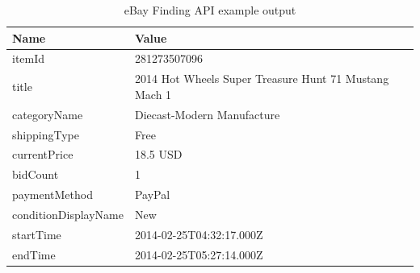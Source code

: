 \begin{table}[h!]
	\begin{center}
	\begin{tabular}{| p{6.5cm} | p{6.5cm} |}
		\hline
		\textbf{Name} & \textbf{Value} \\
		\hline
		itemId & 281273507096 \\
		\hline
		title & 2014 Hot Wheels Super Treasure Hunt 71 Mustang Mach 1 \\
		\hline
		categoryName & Diecast-Modern Manufacture \\
		\hline
		shippingType & Free \\
		\hline
		currentPrice & 18.5 USD \\
		\hline
		bidCount & 1 \\
		\hline
		paymentMethod & PayPal \\
		\hline
		conditionDisplayName & New \\
		\hline
		startTime & 2014-02-25T04:32:17.000Z \\
		\hline
		endTime & 2014-02-25T05:27:14.000Z \\
		\hline
	\end{tabular}
	\end{center}
	\caption{eBay Finding API example output}
\end{table}
